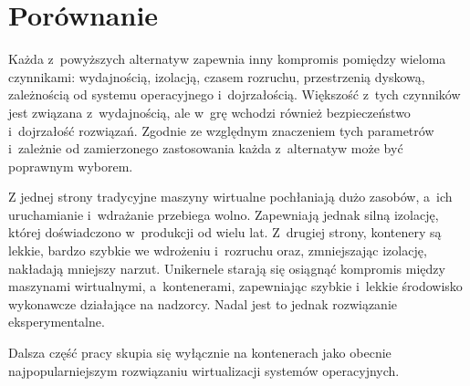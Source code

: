 \section{Porównanie}

Każda z~powyższych alternatyw zapewnia inny kompromis pomiędzy wieloma czynnikami: wydajnością, izolacją, czasem rozruchu, przestrzenią dyskową, zależnością od systemu operacyjnego i~dojrzałością. Większość z~tych czynników jest związana z~wydajnością, ale w~grę wchodzi również bezpieczeństwo i~dojrzałość rozwiązań. Zgodnie ze względnym znaczeniem tych parametrów i~zależnie od zamierzonego zastosowania każda z~alternatyw może być poprawnym wyborem.

Z jednej strony tradycyjne maszyny wirtualne pochłaniają dużo zasobów, a~ich uruchamianie i~wdrażanie przebiega wolno. Zapewniają jednak silną izolację, której doświadczono w~produkcji od wielu lat. Z~drugiej strony, kontenery są lekkie, bardzo szybkie we wdrożeniu i~rozruchu oraz, zmniejszając izolację, nakładają mniejszy narzut. Unikernele starają się osiągnąć kompromis między maszynami wirtualnymi, a~kontenerami, zapewniając szybkie i~lekkie środowisko wykonawcze działające na nadzorcy. Nadal jest to jednak rozwiązanie eksperymentalne. 

Dalsza część pracy skupia się wyłącznie na kontenerach jako obecnie najpopularniejszym rozwiązaniu wirtualizacji systemów operacyjnych.
